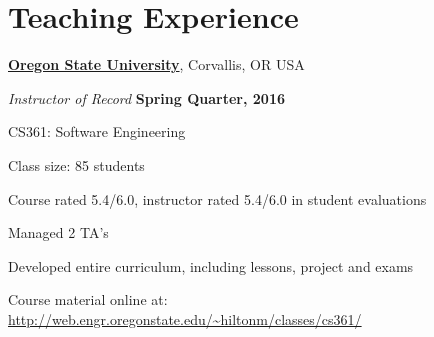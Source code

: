 \documentclass[10pt]{article}
\begin{document}
\section{Teaching Experience}

\href{http://www.oregonstate.edu/}{\textbf{Oregon State University}},
Corvallis, OR USA
\begin{outerlist}
\item[] \textit{Instructor of Record}%
    \hfill \textbf{Spring Quarter, 2016}
    \begin{innerlist}%
       \item CS361: Software Engineering %
       \item Class size: 85 students 
       \item Course rated 5.4/6.0, instructor rated 5.4/6.0 in student evaluations
       \item Managed 2 TA's
       \item Developed entire curriculum, including lessons, project and exams
       \item Course material online at:\\ \url{http://web.engr.oregonstate.edu/~hiltonm/classes/cs361/}  
     \end{innerlist}
\end{outerlist}
\vspace{10pt}
\end{document}
